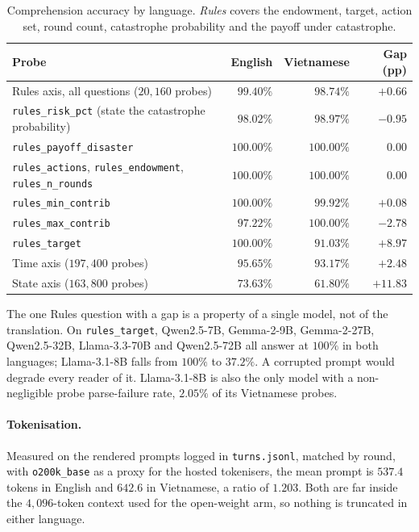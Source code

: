 \documentclass[11pt,a4paper]{article}
\begin{document}
\begin{table}[h]
\centering
\caption{Comprehension accuracy by language. \emph{Rules} covers the endowment, target,
action set, round count, catastrophe probability and the payoff under catastrophe.}
\label{tab:esm-rules}
\begin{tabular}{@{}lrrr@{}}
\toprule
Probe & English & Vietnamese & Gap (pp) \\
\midrule
Rules axis, all questions ($20{,}160$ probes) & $99.40\%$ & $98.74\%$ & $+0.66$ \\
\quad \texttt{rules\_risk\_pct} (state the catastrophe probability) & $98.02\%$ & $98.97\%$ & $-0.95$ \\
\quad \texttt{rules\_payoff\_disaster} & $100.00\%$ & $100.00\%$ & $0.00$ \\
\quad \texttt{rules\_actions}, \texttt{rules\_endowment}, \texttt{rules\_n\_rounds} & $100.00\%$ & $100.00\%$ & $0.00$ \\
\quad \texttt{rules\_min\_contrib} & $100.00\%$ & $99.92\%$ & $+0.08$ \\
\quad \texttt{rules\_max\_contrib} & $97.22\%$ & $100.00\%$ & $-2.78$ \\
\quad \texttt{rules\_target} & $100.00\%$ & $91.03\%$ & $+8.97$ \\
\midrule
Time axis ($197{,}400$ probes) & $95.65\%$ & $93.17\%$ & $+2.48$ \\
State axis ($163{,}800$ probes) & $73.63\%$ & $61.80\%$ & $+11.83$ \\
\bottomrule
\end{tabular}
\end{table}

\noindent The one Rules question with a gap is a property of a single model, not of the
translation. On \texttt{rules\_target}, Qwen2.5-7B, Gemma-2-9B, Gemma-2-27B,
Qwen2.5-32B, Llama-3.3-70B and Qwen2.5-72B all answer at $100\%$ in both languages;
Llama-3.1-8B falls from $100\%$ to $37.2\%$. A corrupted prompt would degrade every
reader of it. Llama-3.1-8B is also the only model with a non-negligible probe
parse-failure rate, $2.05\%$ of its Vietnamese probes.

\paragraph{Tokenisation.} Measured on the rendered prompts logged in
\texttt{turns.jsonl}, matched by round, with \texttt{o200k\_base} as a proxy for the
hosted tokenisers, the mean prompt is $537.4$ tokens in English and $642.6$ in
Vietnamese, a ratio of $1.203$. Both are far inside the $4{,}096$-token context used for
the open-weight arm, so nothing is truncated in either language.
\end{document}

